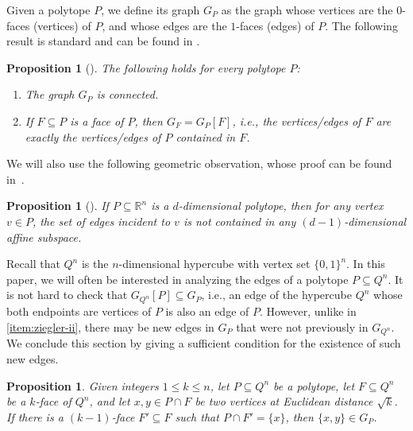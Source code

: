 \documentclass[11pt,a4paper,oneside,reqno]{amsart}
\newtheorem{proposition}[theorem]{Proposition}
\newcommand{\RR}{\mathbb{R}}
\begin{document}
Given a polytope $P$, we define its graph $G_P$ as the graph whose vertices are the $0$-faces (vertices) of $P$, and whose edges are the $1$-faces (edges) of $P$.  The following result is standard and can be found in \cite{lecturepolytopes}.

\begin{proposition}[\cite{lecturepolytopes}]\label{prop:ziegler}
  The following holds for every polytope $P$:
  \begin{enumerate}[label=(\roman*)]
  \item
    The graph $G_P$ is connected.
  \item
    \label{item:ziegler-ii}
    If $F\subseteq P$ is a face of $P$, then $G_F=G_P[F]$, i.e., the vertices/edges of $F$ are exactly the vertices/edges of $P$ contained in $F$.
  \end{enumerate}
\end{proposition}

We will also use the following geometric observation, whose proof can be found in~\cite{randomexppolytopes24}.

\begin{proposition}[{\cite[Proposition~6]{randomexppolytopes24}}]\label{prop:leroux}
  If $P\subseteq \RR^n$ is a $d$-dimensional polytope, then for any vertex $v \in P$, the set of edges incident to $v$ is not contained in any $(d-1)$-dimensional affine subspace.
\end{proposition}

Recall that $Q^n$ is the $n$-dimensional hypercube with vertex set $\{0,1\}^n$. In this paper, we will often be interested in analyzing the edges of a polytope $P \subseteq Q^n$. It is not hard to check that $G_{Q^n}[P] \subseteq G_P$, i.e., an edge of the hypercube $Q^n$ whose both endpoints are vertices of $P$ is also an edge of $P$. However, unlike in  \ref{item:ziegler-ii}, there may be new edges in $G_P$ that were not previously in $G_{Q^n}$. We conclude this section by giving a sufficient condition for the existence of such new edges.

\begin{proposition}\label{prop:geometry}
  Given integers $1\leq k\leq n$, let $P\subseteq Q^n$ be a polytope, let $F\subseteq Q^n$ be a $k$-face of $Q^n$, and let $x,y \in P\cap F$ be two vertices at Euclidean distance $\sqrt{k}$.  If there is a $(k-1)$-face $F' \subseteq F$ such that $P \cap F' = \{x\}$, then $\{x,y\}\in G_P$.
\end{proposition}
\end{document}
